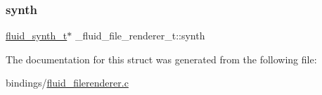 \subsubsection{\texorpdfstring{synth}{synth}}
{\footnotesize\ttfamily \hyperlink{types_8h_ae265f10ae174a13afe010de50d87e1a4}{fluid\+\_\+synth\+\_\+t}$\ast$ \+\_\+fluid\+\_\+file\+\_\+renderer\+\_\+t\+::synth}



The documentation for this struct was generated from the following file\+:\begin{DoxyCompactItemize}
\item 
bindings/\hyperlink{fluid__filerenderer_8c}{fluid\+\_\+filerenderer.\+c}\end{DoxyCompactItemize}
